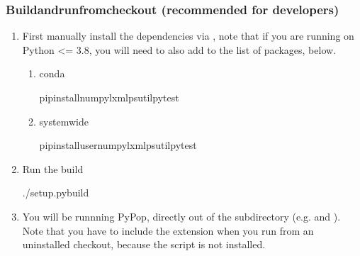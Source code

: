 \documentclass[letterpaper,10pt,english,openany,oneside]{sphinxmanual}
\begin{document}
\subsubsection{Build\sphinxhyphen{}and\sphinxhyphen{}run\sphinxhyphen{}from\sphinxhyphen{}checkout (recommended for developers)}
\label{\detokenize{docs/guide-chapter-contributing:build-and-run-from-checkout-recommended-for-developers}}\begin{enumerate}
%
\item {} 
\sphinxAtStartPar
First manually install the dependencies via , note that if you
are running on Python \textless{}= 3.8, you will need to also add
 to the list of packages, below.
\begin{enumerate}
%
\item {} 
\sphinxAtStartPar
conda

\begin{sphinxVerbatim}[commandchars=\\\{\}]
pipinstallnumpylxmlpsutilpytest
\end{sphinxVerbatim}

\item {} 
\sphinxAtStartPar
system\sphinxhyphen{}wide

\begin{sphinxVerbatim}[commandchars=\\\{\}]
pipinstall\PYGZhy{}\PYGZhy{}usernumpylxmlpsutilpytest
\end{sphinxVerbatim}

\end{enumerate}

\item {} 
\sphinxAtStartPar
Run the build

\begin{sphinxVerbatim}[commandchars=\\\{\}]
./setup.pybuild
\end{sphinxVerbatim}

\item {} 
\sphinxAtStartPar
You will be runnning PyPop, directly out of the 
subdirectory (e.g.  and
). Note that you have to include the
 extension when you run from an uninstalled checkout,
because the script is not installed.

\end{enumerate}
\end{document}

